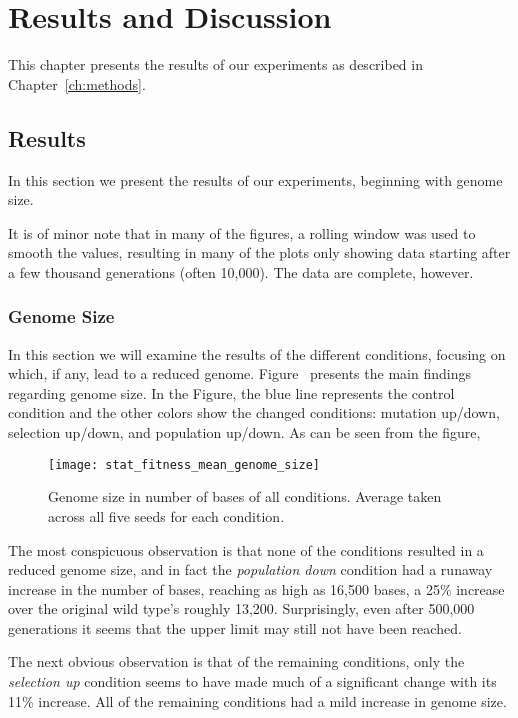 \chapter{Results and Discussion}\label{ch:results_discussion}
This chapter presents the results of our experiments as described in Chapter~\ref{ch:methods}. 

\section{Results}\label{results}
In this section we present the results of our experiments, beginning with genome size. 

It is of minor note that in many of the figures, a rolling window was used to smooth the values, resulting in many of the plots only showing data starting after a few thousand generations (often 10,000). The data are complete, however. 

\subsection{Genome Size}
In this section we will examine the results of the different conditions, focusing on which, if any, lead to a reduced genome. Figure~%
presents the main findings regarding genome size. In the Figure, the blue line %
represents the control condition and the other colors show the changed conditions: mutation up/down, selection up/down, and population up/down. As can be seen from the figure, 
\begin{figure}[H]
	\texttt{[image: stat\_fitness\_mean\_genome\_size]}
	\centering
	\caption[Genome size]{Genome size in number of bases of all conditions. Average taken across all five seeds for each condition.}
	\label{fig:genome_size}
\end{figure}
The most conspicuous observation is that none of the conditions resulted in a reduced genome size, and in fact the \textit{population down} condition had a runaway increase in the number of bases, reaching as high as 16,500 bases, a 25\% increase over the original wild type's roughly 13,200. Surprisingly, even after 500,000 generations it seems that the upper limit may still not have been reached. 

The next obvious observation is that of the remaining conditions, only the \textit{selection up} condition seems to have made much of a significant change with its 11\% increase. All of the remaining conditions had a mild increase in genome size. 

